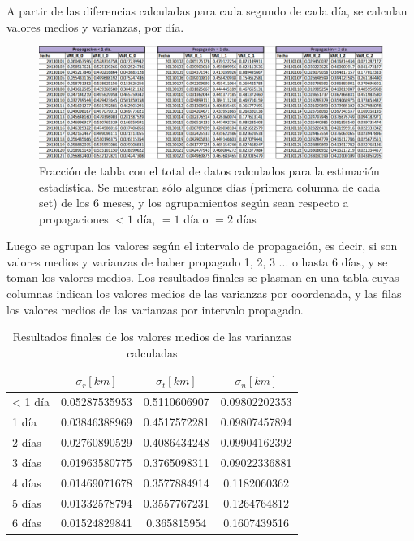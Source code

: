 {A partir de las diferencias calculadas para cada segundo de cada d\'ia, se calculan valores medios y varianzas, por d\'ia.\\


\begin{figure}[!h]
\centering
\includegraphics[width=\textwidth]{imagenes/tablacompleta}
\caption[Tabla de Estimaci\'on de errores.]{Fracci\'on de tabla con el total de datos calculados para la estimaci\'on estad\'istica. Se muestran s\'olo algunos d\'ias (primera columna de cada set) de los 6 meses, y los agrupamientos seg\'un sean respecto a propagaciones $< 1$ d\'ia, $= 1$ d\'ia o $= 2$ d\'ias}
\label{fig:tablacompleta}
\end{figure}

Luego se agrupan los valores seg\'un el intervalo de propagaci\'on, es decir, si son valores medios y varianzas de haber propagado 1, 2, 3 ... o hasta 6 d\'ias, y se toman los valores medios. Los resultados finales se plasman en una tabla cuyas columnas indican los valores medios de las varianzas por coordenada, y las filas los valores medios de las varianzas por intervalo propagado.\\

\begin{table}[!h]
\centering
\caption[Tabla con los valores medios para la propagaci\'on de errores.]{Resultados finales de los valores medios de las varianzas calculadas}
\begin{tabular}{|l|ccc|}
\hline
&$\sigma_r [km]$ &$\sigma_t [km]$ &$\sigma_n [km]$\\
\hline
< 1 d\'ia & 0.05287535953&0.5110606907&0.09802202353\\
1 d\'ia & 0.03846388969&0.4517572281&0.09807457894\\
2 d\'ias & 0.02760890529&0.4086434248&0.09904162392\\
3 d\'ias & 0.01963580775&0.3765098311&0.09022336881\\
4 d\'ias & 0.01469071678&0.3577884914&0.1182060362\\
5 d\'ias & 0.01332578794&0.3557767231&0.1264764812\\
6 d\'ias & 0.01524829841&0.365815954&0.1607439516\\
\hline
\end{tabular}
\label{tab:resultatabla}
\end{table}

}
